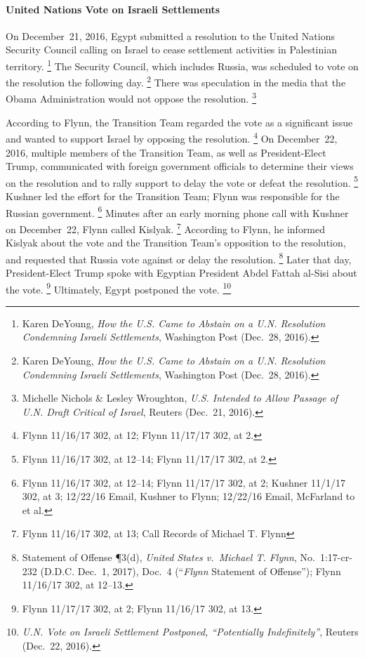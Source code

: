 \paragraph{United Nations Vote on Israeli Settlements}

On December~21, 2016, Egypt submitted a resolution to the United Nations Security Council calling on Israel to cease settlement activities in Palestinian territory.%
\footnote{Karen DeYoung, \textit{How the U.S. Came to Abstain on a U.N. Resolution Condemning Israeli Settlements}, Washington Post (Dec.~28, 2016).}
The Security Council, which includes Russia, was scheduled to vote on the resolution the following day.%
\footnote{Karen DeYoung, \textit{How the U.S. Came to Abstain on a U.N. Resolution Condemning Israeli Settlements}, Washington Post (Dec.~28, 2016).}
There was speculation in the media that the Obama Administration would not oppose the resolution.%
\footnote{Michelle Nichols \& Lesley Wroughton, \textit{U.S. Intended to Allow Passage of U.N. Draft Critical of Israel}, Reuters (Dec.~21, 2016).}

According to Flynn, the Transition Team regarded the vote as a significant issue and wanted to support Israel by opposing the resolution.%
\footnote{Flynn 11/16/17 302, at 12;
Flynn 11/17/17 302, at 2.}
On December~22, 2016, multiple members of the Transition Team, as well as President-Elect Trump, communicated with foreign government officials to determine their views on the resolution and to rally support to delay the vote or defeat the resolution.%
\footnote{Flynn 11/16/17 302, at 12--14;
Flynn 11/17/17 302, at 2.}
Kushner led the effort for the Transition Team; Flynn was responsible for the Russian government.%
\footnote{Flynn 11/16/17 302, at 12--14;
Flynn 11/17/17 302, at 2;
Kushner 11/1/17 302, at 3;
12/22/16 Email, Kushner to Flynn;
12/22/16 Email, McFarland to  et al.}
Minutes after an early morning phone call with Kushner on December~22, Flynn called Kislyak.%
\footnote{Flynn 11/16/17 302, at 13;
Call Records of Michael T. Flynn }
According to Flynn, he informed Kislyak about the vote and the Transition Team's opposition to the resolution, and requested that Russia vote against or delay the resolution.%
\footnote{Statement of Offense \P 3(d), \textit{United States v.\ Michael T. Flynn}, No.~1:17-cr-232 (D.D.C. Dec.~1, 2017), Doc.~4 (“\textit{Flynn} Statement of Offense”);
Flynn 11/16/17 302, at 12--13.}
Later that day, President-Elect Trump spoke with Egyptian President Abdel Fattah al-Sisi about the vote.%
\footnote{Flynn 11/17/17 302, at 2;
Flynn 11/16/17 302, at 13.}
Ultimately, Egypt postponed the vote.%
\footnote{\textit{U.N. Vote on Israeli Settlement Postponed, “Potentially Indefinitely”}, Reuters (Dec.~22, 2016).}

